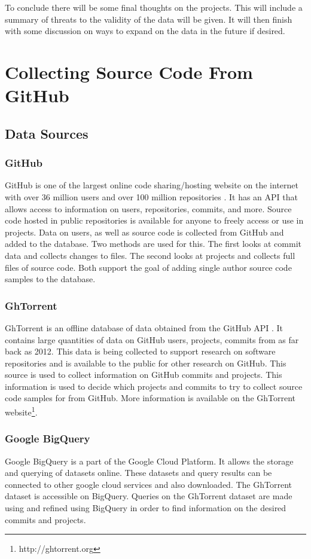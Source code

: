 \documentclass[12pt]{article}
\begin{document}
To conclude there will be some final thoughts on the projects. This will include a summary of threats to the validity of the data will be given. It will then finish with some discussion on ways to expand on the data in the future if desired.


\section{Collecting Source Code From GitHub}


\subsection{Data Sources}
\subsubsection*{GitHub}
GitHub is one of the largest online code sharing/hosting website on the internet with over 36 million users and over 100 million repositories \cite{WEBSITE:Git1}. It has an API that allows access to information on users, repositories, commits, and more. Source code hosted in public repositories is available for anyone to freely access or use in projects. Data on users, as well as source code is collected from GitHub and added to the database. Two methods are used for this. The first looks at commit data and collects changes to files. The second looks at projects and collects full files of source code. Both support the goal of adding single author source code samples to the database.

\subsubsection*{GhTorrent}
GhTorrent is an offline database of data obtained from the GitHub API \cite{Gousi13}. It contains large quantities of data on GitHub users, projects, commits from as far back as 2012. This data is being collected to support research on software repositories and is available to the public for other research on GitHub. This source is used to collect information on GitHub commits and projects. This information is used to decide which projects and commits to try to collect source code samples for from GitHub. More information is available on the GhTorrent website\footnote{http://ghtorrent.org}.

\subsubsection*{Google BigQuery}
Google BigQuery is a part of the Google Cloud Platform. It allows the storage and querying of datasets online. These datasets and query results can be connected to other google cloud services and also downloaded. The GhTorrent dataset is accessible on BigQuery. Queries on the GhTorrent dataset are made  using and refined using BigQuery in order to find information on the desired commits and projects.
\end{document}
